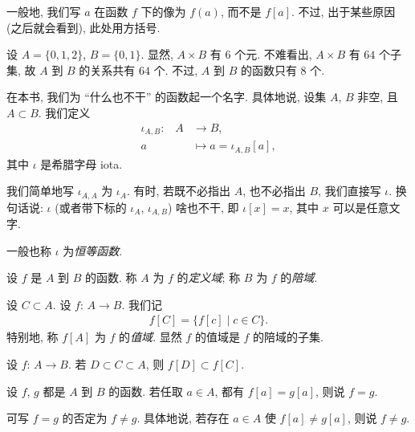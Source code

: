 \begin{remark}
    一般地, 我们写 $a$ 在函数 $f$ 下的像为 $f(a)$, 而不是 $f[a]$. 不过, 出于某些原因 (之后就会看到), 此处用方括号.
\end{remark}

\begin{example}
    设 $A = \{ 0,1,2 \}$, $B = \{ 0,1 \}$. 显然, $A \times B$ 有 $6$ 个元. 不难看出, $A \times B$ 有 $64$ 个子集, 故 $A$ 到 $B$ 的关系共有 $64$ 个. 不过, $A$ 到 $B$ 的函数只有 $8$ 个.
\end{example}

\begin{definition}
    在本书, 我们为 ``什么也不干'' 的函数起一个名字. 具体地说, 设集 $A$, $B$ 非空, 且 $A \subset B$. 我们定义
    \begin{align*}
        \text{$\iota_{A,B}$:} \quad
        A & \to B,                       \\
        a & \mapsto a = \iota_{A,B} [a],
    \end{align*}
    其中 $\iota$ 是希腊字母 iota.

    我们简单地写 $\iota_{A,A}$ 为 $\iota_{A}$. 有时, 若既不必指出 $A$, 也不必指出 $B$, 我们直接写 $\iota$. 换句话说: $\iota$ (或者带下标的 $\iota_{A}$, $\iota_{A,B}$) 啥也不干, 即 $\iota[x] = x$, 其中 $x$ 可以是任意文字.

    一般也称 $\iota$ 为\emph{恒等函数}.
\end{definition}

\begin{definition}
    设 $f$ 是 $A$ 到 $B$ 的函数. 称 $A$ 为 $f$ 的\emph{定义域}; 称 $B$ 为 $f$ 的\emph{陪域}.
\end{definition}

\begin{definition}
    设 $C \subset A$. 设 $f$: $A \to B$. 我们记
    \begin{align*}
        f[C] = \{ f[c] \mid \text{$c \in C$} \}.
    \end{align*}
    特别地, 称 $f[A]$ 为 $f$ 的\emph{值域}. 显然 $f$ 的值域是 $f$ 的陪域的子集.
\end{definition}

\begin{remark}
    设 $f$: $A \to B$. 若 $D \subset C \subset A$, 则 $f[D] \subset f[C]$.
\end{remark}

\begin{definition}
    设 $f$, $g$ 都是 $A$ 到 $B$ 的函数. 若任取 $a \in A$, 都有 $f[a] = g[a]$, 则说 $f = g$.

    可写 $f = g$ 的否定为 $f \neq g$. 具体地说, 若存在 $a \in A$ 使 $f[a] \neq g[a]$, 则说 $f \neq g$.
\end{definition}

